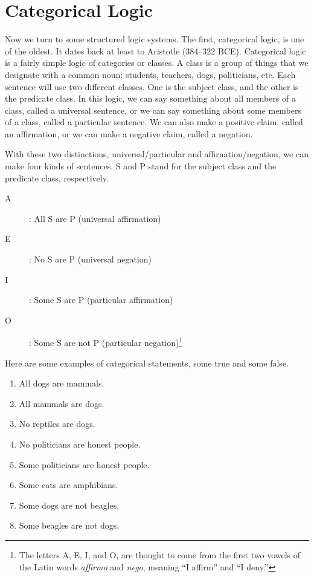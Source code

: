 \chapter{Categorical Logic}
\label{chap:categorical}




Now we turn to some structured logic systems. The first, categorical logic, is one of the oldest. It dates back at least to Aristotle (384--322 BCE). Categorical logic is a fairly simple logic of categories or classes. A class is a group of things that we designate with a common noun: students, teachers, dogs, politicians, etc. Each sentence will use two different classes. One is the subject class, and the other is the predicate class. In this logic, we can say something about all members of a class, called a universal sentence, or we can say something about some members of a class, called a particular sentence. We can also make a positive claim, called an affirmation, or we can make a negative claim, called a negation.

With these two distinctions, universal/particular and affirnation/negation, we can make four kinds of sentences. S and P stand for the subject class and the predicate class, respectively.

\begin{description}
\item[A]: All S are P (universal affirmation)
\item[E]: No S are P (universal negation)
\item[I]: Some S are P (particular affirmation)
\item[O]: Some S are not P (particular negation)\footnote{The letters A, E, I, and O, are thought to come from the first two vowels of the Latin words \emph{affirmo} and \emph{nego}, meaning \enquote{I affirm} and \enquote{I deny.}
} 
\end{description}

Here are some examples of categorical statements, some true and some false.

\begin{enumerate}
\item All dogs are mammals.
\item All mammals are dogs.
\item No reptiles are dogs.
\item No politicians are honest people.
\item Some politicians are honest people.
\item Some cats are amphibians.
\item Some dogs are not beagles.
\item Some beagles are not dogs.
\end{enumerate}

